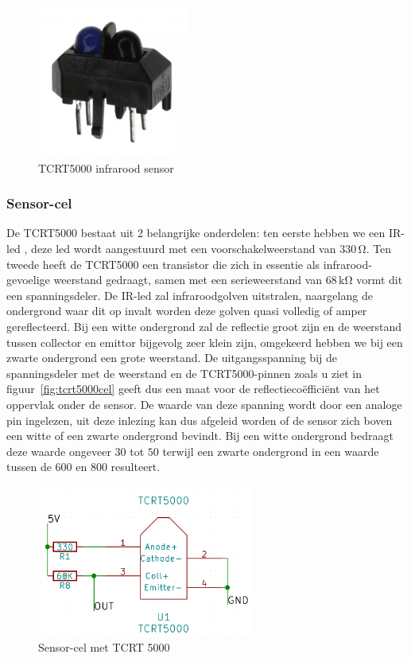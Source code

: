 \begin{figure}[H]
	\centering
	\includegraphics[height=5cm]{tcrt5000.png}
	\caption{TCRT5000 infrarood sensor\label{fig:tcrt5000}}
\end{figure}

\subsubsection*{Sensor-cel}
De TCRT5000 bestaat uit 2 belangrijke onderdelen: ten eerste hebben we een IR-led , deze led wordt aangestuurd met een voorschakelweerstand van $330\,\mathrm{\Omega}$. Ten tweede heeft de TCRT5000 een transistor die zich in essentie als infrarood-gevoelige weerstand gedraagt, samen met een serieweerstand van $68\,\mathrm{k\Omega}$ vormt dit een spanningsdeler. De IR-led zal infraroodgolven uitstralen, naargelang de ondergrond waar dit op invalt worden deze golven quasi volledig of amper gereflecteerd. Bij een witte ondergrond zal de reflectie groot zijn en de weerstand tussen collector en emittor bijgevolg zeer klein zijn, omgekeerd hebben we bij een zwarte ondergrond een grote weerstand. De uitgangsspanning bij de spanningsdeler met de weerstand en de TCRT5000-pinnen zoals u ziet in figuur~\vref{fig:tcrt5000cel} geeft dus een maat voor de reflectieco\"effici\"ent van het oppervlak onder de sensor. De waarde van deze spanning wordt door een analoge pin ingelezen, uit deze inlezing kan dus afgeleid worden of de sensor zich boven een witte of een zwarte ondergrond bevindt. Bij een witte ondergrond bedraagt deze waarde ongeveer $30$ tot $50$ terwijl een zwarte ondergrond in een waarde tussen de $600$ en $800$ resulteert.

\begin{figure}[H]
	\centering
	\includegraphics[height=5cm]{tcrt5000cel.png}
	\caption{Sensor-cel met TCRT 5000\label{fig:tcrt5000cel}}
\end{figure}

